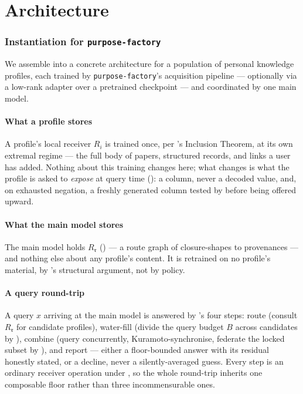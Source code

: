 \documentclass[11pt,twocolumn,a4paper]{article}
\theoremstyle{rdm}
\theoremstyle{definition}
\theoremstyle{remark}
\newcommand{\Rec}{R}
\newcommand{\rg}{\mathfrak{r}}
\begin{document}
\part{Architecture}
\label{part:architecture}

\section{Instantiation for \texttt{purpose-factory}}
\label{sec:architecture}

We assemble 
into a concrete architecture for a population of personal knowledge
profiles, each trained by \texttt{purpose-factory}'s acquisition pipeline
\citep[Constr.~4.1]{sachikonye-accountable-compilation} — optionally via a
low-rank adapter over a pretrained checkpoint \citep{hu2021lora} — and
coordinated by one main model.

\subsection{What a profile stores}
A profile's local receiver $\Rec_i$ is trained once, per
\citet[Thm.~3.1]{sachikonye-accountable-compilation}'s Inclusion Theorem, at
its own extremal regime — the full body of papers, structured records, and
links a user has added. Nothing about this training changes here; what
changes is what the profile is asked to \emph{expose} at query time
(): a column, never a decoded value, and, on
exhausted negation, a freshly generated column tested by
 before being offered upward.

\subsection{What the main model stores}
The main model holds $\Rec_\rg$ () — a route graph
of closure-shapes to provenances — and nothing else about any profile's
content. It is retrained on no profile's material, by
's structural argument, not by policy.

\subsection{A query round-trip}
A query $x$ arriving at the main model is answered by
's four steps: route (consult $\Rec_\rg$ for
candidate profiles), water-fill (divide the query budget $B$ across
candidates by ), combine (query concurrently,
Kuramoto-synchronise, federate the locked subset by
), and report — either a floor-bounded answer with
its residual honestly stated, or a decline, never a silently-averaged
guess. Every step is an ordinary receiver operation under
, so the whole round-trip inherits one composable floor
rather than three incommensurable ones.
\end{document}
